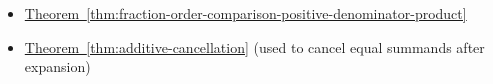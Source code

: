 \begin{dependencies}
\begin{itemize}
  \item \hyperref[thm:fraction-order-comparison-positive-denominator-product]{Theorem~\ref*{thm:fraction-order-comparison-positive-denominator-product}}
  \item \hyperref[thm:additive-cancellation]{Theorem~\ref*{thm:additive-cancellation}}
        \textnormal{(used to cancel equal summands after expansion)}
\end{itemize}
\end{dependencies}

\clearpage
